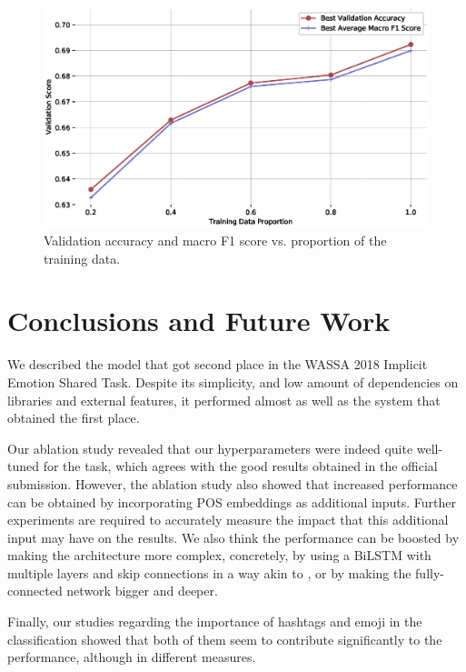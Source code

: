 \documentclass[11pt,a4paper]{article}
\begin{document}
\begin{figure}[!h]
    \centering
    \includegraphics[width=\columnwidth]{images/acc_vs_tdp_variation.eps}
    \caption{Validation accuracy and macro F1 score vs. proportion of the training data.}
    \label{fig:data_amt_vs_acc}
\end{figure}

\section{Conclusions and Future Work}

We described the model that got second place in the WASSA 2018 Implicit Emotion Shared Task. Despite its simplicity, and low amount of dependencies on libraries and external features, it performed almost as well as the system that obtained the first place.

Our ablation study revealed that our hyperparameters were indeed quite well-tuned for the task, which agrees with the good results obtained in the official submission. However, the ablation study also showed that increased performance can be obtained by incorporating POS embeddings as additional inputs. Further experiments are required to accurately measure the impact that this additional input may have on the results. We also think the performance can be boosted by making the architecture more complex, concretely, by using a BiLSTM with multiple layers and skip connections in a way akin to \cite{peters2018deep}, or by making the fully-connected network bigger and deeper.

Finally, our studies regarding the importance of hashtags and emoji in the classification showed that both of them seem to contribute significantly to the performance, although in different measures. 



\end{document}
